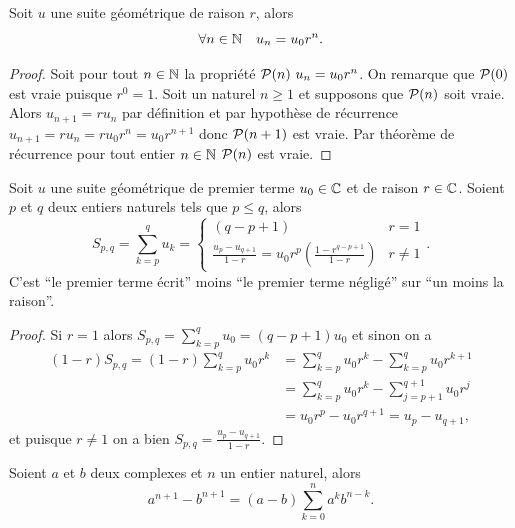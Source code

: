\begin{prop}
  Soit \(u\) une suite géométrique de raison \(r\), alors
  \begin{equation}
    \forall n \in \N \quad u_n=u_0r^n.
  \end{equation}
\end{prop}
\begin{proof}
  Soit pour tout \(n\in\N\) la propriété \(\P(n)\ u_n=u_0r^n\). On remarque que \(\P(0)\) est vraie puisque \(r^0=1\). Soit un naturel \(n\geqslant 1\) et supposons que \(\P(n)\) soit vraie. Alors \(u_{n+1}=r u_n\) par définition et par hypothèse de récurrence \(u_{n+1}=r u_n = r u_0 r^n=u_0 r^{n+1}\) donc \(\P(n+1)\) est vraie. Par théorème de récurrence pour tout entier \(n\in\N\) \(\P(n)\) est vraie.
\end{proof}
\begin{prop}
  Soit \(u\) une suite géométrique de premier terme \(u_0\in\C\) et de raison \(r\in\C\). Soient \(p\) et \(q\) deux entiers naturels tels que \(p\leqslant q\), alors
  \begin{equation}
    S_{p,q}=\sum_{k=p}^q u_k=
    \begin{cases}
      (q-p+1) & r=1 \\
      \frac{u_p-u_{q+1}}{1-r}=u_0r^p\left(\frac{1-r^{q-p+1}}{1-r}\right) & r \neq 1
    \end{cases}.
  \end{equation}
  C'est ``le premier terme écrit'' moins ``le premier terme négligé'' sur ``un moins la raison''.
\end{prop}
\begin{proof}
  Si \(r=1\) alors \(S_{p,q}=\sum_{k=p}^qu_0=(q-p+1)u_0\) et sinon on a
  \begin{align}
    (1-r)S_{p,q}=(1-r)\sum_{k=p}^q u_0r^k &= \sum_{k=p}^q u_0r^k - \sum_{k=p}^q u_0r^{k+1}\\
&=\sum_{k=p}^q u_0r^k - \sum_{j=p+1}^{q+1} u_0r^{j}\\
&=u_0 r^p -u_0 r^{q+1} = u_p-u_{q+1},
  \end{align}
et puisque \(r\neq 1\) on a bien  \(S_{p,q}=\frac{u_p-u_{q+1}}{1-r}\).
\end{proof}
\begin{prop}
  Soient \(a\) et \(b\) deux complexes et \(n\) un entier naturel, alors
  \begin{equation}
    a^{n+1}-b^{n+1}=(a-b)\sum_{k=0}^n a^k b^{n-k}.
  \end{equation}
\end{prop}
